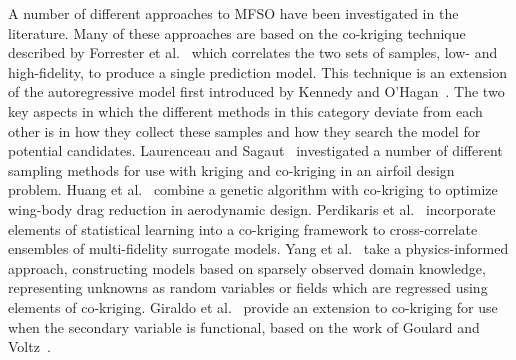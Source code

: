A number of different approaches to MFSO have been investigated in the literature. Many of these approaches are based on the co-kriging technique described by Forrester et al.~\cite{forrester2007multi} which correlates the two sets of samples, low- and high-fidelity, to produce a single prediction model. This technique is an extension of the autoregressive model first introduced by Kennedy and O'Hagan~\cite{kennedy2000predicting}. The two key aspects in which the different methods in this category deviate from each other is in how they collect these samples and how they search the model for potential candidates. Laurenceau and Sagaut~\cite{laurenceau2008building} investigated a number of different sampling methods for use with kriging and co-kriging in an airfoil design problem. Huang et al.~\cite{huang2013research} combine a genetic algorithm with co-kriging to optimize wing-body drag reduction in aerodynamic design. Perdikaris et al.~\cite{perdikaris2015multi} incorporate elements of statistical learning into a co-kriging framework to cross-correlate ensembles of multi-fidelity surrogate models. Yang et al.~\cite{yang2019physics} take a physics-informed approach, constructing models based on sparsely observed domain knowledge, representing unknowns as random variables or fields which are regressed using elements of co-kriging. Giraldo et al.~\cite{giraldo2020cokriging} provide an extension to co-kriging for use when the secondary variable is functional, based on the work of Goulard and Voltz~\cite{goulard1993geostatistical}.

